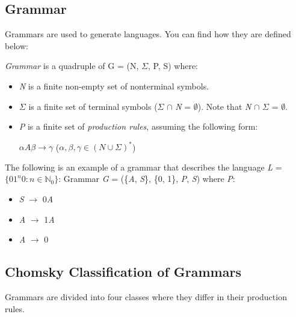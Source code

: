 \subsection{Grammar}

Grammars are used to generate languages. You can find how they are defined below:

\begin{definition}
    \textit{Grammar} is a quadruple of G = (N, $\Sigma$, P, S) where:
\end{definition}
\begin{itemize}
    \item \textit{N} is a finite non-empty set of nonterminal symbols.
    \item $\Sigma$ is a finite set of terminal symbols ($\Sigma$ $\cap$ \textit{N} = $\emptyset$). Note that \textit{N} $\cap$ $\Sigma$ = $\emptyset$.
    \item \textit{P} is a finite set of \textit{production rules}, assuming the following form:\\

    \centerline{$\alpha\textit{A}\beta \rightarrow \gamma$ ($\alpha, \beta, \gamma \in (\textit{N} \cup \Sigma)^*$)}
\end{itemize}

The following is an example of a grammar that describes the language \textit{L} = $\{01^\textit{n}0 : \textit{n} \in \mathbb{N}_0\}$:
Grammar \textit{G} = (\{\textit{A}, \textit{S}\}, \{0, 1\}, \textit{P}, \textit{S}) where \textit{P}:
\begin{itemize}
    \item \textit{S} $\rightarrow$ 0\textit{A}
    \item \textit{A} $\rightarrow$ 1\textit{A}
    \item \textit{A} $\rightarrow$ 0
\end{itemize}

\subsection{Chomsky Classification of Grammars}

Grammars are divided into four classes where they differ in their production rules. 

